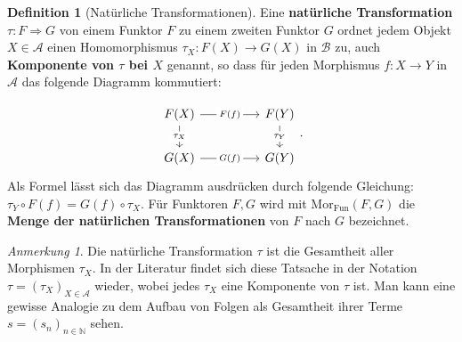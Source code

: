 \documentclass{article}
\theoremstyle{plain}
\theoremstyle{definition}
\newtheorem{defn}{Definition}[section]
\theoremstyle{remark}
\newtheorem*{rem}{Anmerkung}
\begin{document}
\begin{defn}[Natürliche Transformationen]
Eine \textbf{natürliche Transformation} $\tau: F \Longrightarrow G$ von einem Funktor $F$ zu einem zweiten Funktor $G$ ordnet jedem Objekt $X \in \mathcal{A}$ einen Homomorphismus $\tau_{X}: F(X) \rightarrow G(X)$ in $\mathcal{B}$ zu, auch \textbf{Komponente von $\tau$ bei $X$} genannt, so dass für jeden Morphismus $f: X \rightarrow Y$ in $\mathcal{A}$ das folgende Diagramm kommutiert:
\end{defn}
\begin{equation}
	\begin{tikzcd}
	F(X) \arrow[rr, "F(f)" description] \arrow[d, "\tau_{X}" description] &  & F(Y) \arrow[d, "\tau_{Y}" description] \\
	G(X) \arrow[rr, "G(f)" description]                                   &  & G(Y)                                  
	\end{tikzcd}.
\end{equation}
Als Formel lässt sich das Diagramm ausdrücken durch folgende Gleichung: $\tau_{Y} \circ F(f) = G(f) \circ \tau_{X}$. Für Funktoren $F,G$ wird mit $\text{Mor}_{\text{Fun}}(F,G)$ die \textbf{Menge der natürlichen Transformationen} von $F$ nach $G$ bezeichnet.

\begin{rem}
Die natürliche Transformation $\tau$ ist die Gesamtheit aller Morphismen $\tau_{X}$. In der Literatur findet sich diese Tatsache in der Notation $\tau = (\tau_{X})_{X \in \mathcal{A}}$ wieder, wobei jedes $\tau_{X}$ eine Komponente von $\tau$ ist. Man kann eine gewisse Analogie zu dem Aufbau von Folgen als Gesamtheit ihrer Terme $s = (s_n)_{n \in \mathbb{N}}$ sehen.
\end{rem}
\end{document}
